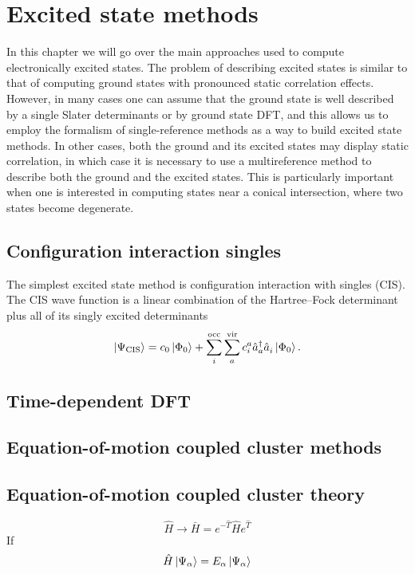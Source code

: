 \documentclass[../Main/chem532-notes.tex]{subfiles}
\begin{document}
\setcounter{chapter}{9}

\chapter{Excited state methods}

In this chapter we will go over the main approaches used to compute electronically excited states.
The problem of describing excited states is similar to that of computing ground states with pronounced static correlation effects.
However, in many cases one can assume that the ground state is well described by a single Slater determinants or by ground state DFT, and this allows us to employ the formalism of single-reference methods as a way to build excited state methods.
In other cases, both the ground and its excited states may display static correlation, in which case it is necessary to use a multireference method to describe both the ground and the excited states.
This is particularly important when one is interested in computing states near a conical intersection, where two states become degenerate.

\section{Configuration interaction singles}
The simplest excited state method is configuration interaction with singles (CIS).
The CIS wave function is a linear combination of the Hartree--Fock determinant plus all of its singly excited determinants
\begin{equation}
\ket{\Psi_\mathrm{CIS}} = c_0 \ket{\Phi_0}  + \sum_{i}^{\mathrm{occ}}\sum_{a}^{\mathrm{vir}} c_i^a \hat{a}_{a}^{\dagger}\hat{a}_{i}^{\,} \ket{\Phi_0}.
\end{equation}

\section{Time-dependent DFT}

\section{Equation-of-motion coupled cluster methods}

\section{Equation-of-motion coupled cluster theory}
\begin{equation}
\hat{H} \rightarrow \bar{H} = e^{-\hat{T}} \hat{H} e^{\hat{T}} 
\end{equation}
If 
\begin{equation}
\hat{H}  \ket{\Psi_\alpha} = E_\alpha \ket{\Psi_\alpha}
\end{equation}
\end{document}
